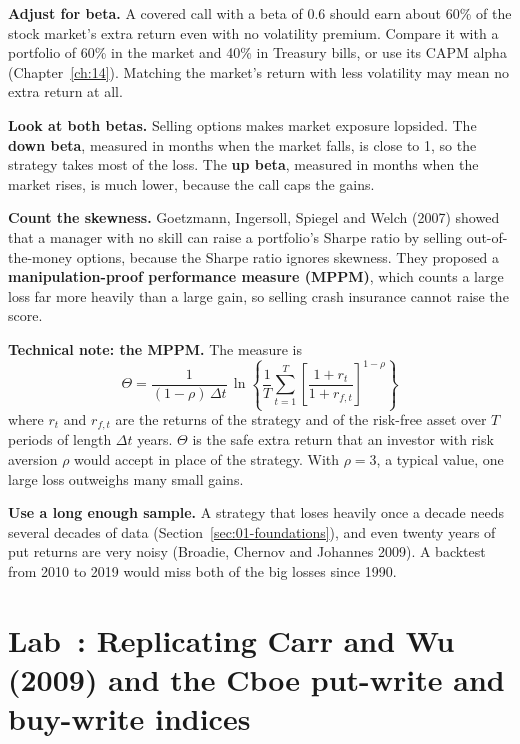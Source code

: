\textbf{Adjust for beta.} A covered call with a beta of 0.6 should earn about 60\% of the stock market's extra return even with no volatility premium. Compare it with a portfolio of 60\% in the market and 40\% in Treasury bills, or use its CAPM alpha (Chapter~\ref{ch:14}). Matching the market's return with less volatility may mean no extra return at all.

\textbf{Look at both betas.} Selling options makes market exposure lopsided. The \textbf{down beta}, measured in months when the market falls, is close to 1, so the strategy takes most of the loss. The \textbf{up beta}, measured in months when the market rises, is much lower, because the call caps the gains.

\textbf{Count the skewness.} Goetzmann, Ingersoll, Spiegel and Welch (2007) showed that a manager with no skill can raise a portfolio's Sharpe ratio by selling out-of-the-money options, because the Sharpe ratio ignores skewness. They proposed a \textbf{manipulation-proof performance measure (MPPM)}, which counts a large loss far more heavily than a large gain, so selling crash insurance cannot raise the score.

\begin{technote}
\textbf{Technical note: the MPPM.} The measure is
\begin{equation}
  \Theta = \frac{1}{(1 - \rho)\,\Delta t}\,\ln\!\left\{\frac{1}{T}\sum_{t=1}^{T}\left[\frac{1 + r_t}{1 + r_{f,t}}\right]^{1-\rho}\right\}
  \label{eq:16-mppm}
\end{equation}
where $r_t$ and $r_{f,t}$ are the returns of the strategy and of the risk-free asset over $T$ periods of length $\Delta t$ years. $\Theta$ is the safe extra return that an investor with risk aversion $\rho$ would accept in place of the strategy. With $\rho = 3$, a typical value, one large loss outweighs many small gains.
\end{technote}

\textbf{Use a long enough sample.} A strategy that loses heavily once a decade needs several decades of data (Section~\ref{sec:01-foundations}), and even twenty years of put returns are very noisy (Broadie, Chernov and Johannes 2009). A backtest from 2010 to 2019 would miss both of the big losses since 1990.


\section{Lab~\thechapter: Replicating Carr and Wu (2009) and the Cboe put-write and buy-write indices}
\label{sec:16-lab}

